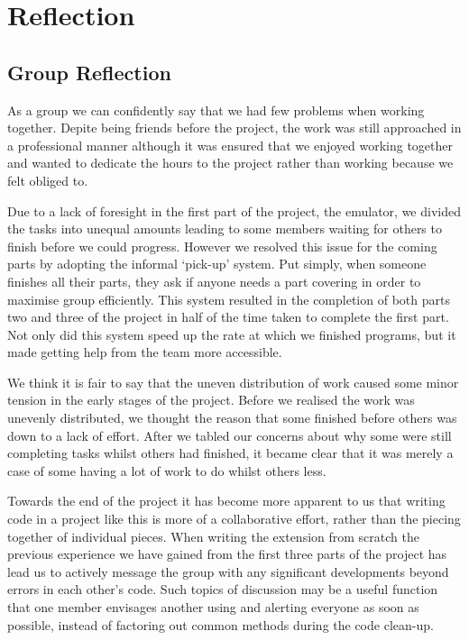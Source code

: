 \documentclass[11pt]{article}
\begin{document}

\section{Reflection}
\subsection{Group Reflection}
As a group we can confidently say that we had few problems when working together. Depite being friends before the project, the work was still approached in a professional manner although it was ensured that we enjoyed working together and wanted to dedicate the hours to the project rather than working because we felt obliged to.\par
Due to a lack of foresight in the first part of the project, the emulator, we divided the tasks into unequal amounts leading to some members waiting for others to finish before we could progress. However we resolved this issue for the coming parts by adopting the informal `pick-up' system. Put simply, when someone finishes all their parts, they ask if anyone needs a part covering in order to maximise group efficiently. This system resulted in the completion of both parts two and three of the project in half of the time taken to complete the first part. Not only did this system speed up the rate at which we finished programs, but it made getting help from the team more accessible. \par
We think it is fair to say that the uneven distribution of work caused some minor tension in the early stages of the project. Before we realised the work was unevenly distributed, we thought the reason that some finished before others was down to a lack of effort. After we tabled our concerns about why some were still completing tasks whilst others had finished, it became clear that it was merely a case of some having a lot of work to do whilst others less.\par
Towards the end of the project it has become more apparent to us that writing code in a project like this is more of a collaborative effort, rather than the piecing together of individual pieces. When writing the extension from scratch the previous experience we have gained from the first three parts of the project has lead us to actively message the group with any significant developments beyond errors in each other's code. Such topics of discussion may be a useful function that one member envisages another using and alerting everyone as soon as possible, instead of factoring out common methods during the code clean-up.\par
\end{document}
